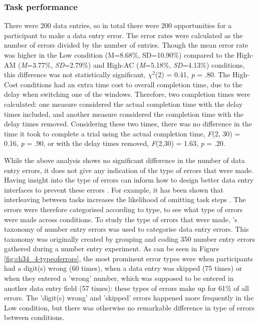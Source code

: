 \subsubsection{Task performance}
There were 200 data entries, so in total there were 200 opportunities for a participant to make a data entry error. The error rates were calculated as the number of errors divided by the number of entries. Though the mean error rate was higher in the Low condition (M=8.68\%, SD=10.90\%) compared to the High-AM (\textit{M}=3.77\%, \textit{SD}=2.79\%) and High-AC (\textit{M}=5.18\%, \textit{SD}=4.13\%) conditions, this difference was not statistically significant, $\chi^2$(2) = 0.41, \textit{p} = .80. 
The High-Cost conditions had an extra time cost to overall completion time, due to the delay when switching one of the windows. Therefore, two completion times were calculated: one measure considered the actual completion time with the delay times included, and another measure considered the completion time with the delay times removed. Considering these two times, there was no difference in the time it took to complete a trial using the actual completion time,  \textit{F}(2, 30) = 0.16, \textit{p} = .90, or with the delay times removed, \textit{F}(2,30) = 1.63, \textit{p} = .20.


While the above analysis shows no significant difference in the number of data entry errors, it does not give any indication of the type of errors that were made. Having insight into the type of errors can inform how to design better data entry interfaces to prevent these errors \citep{Wiseman2011}. For example, it has been shown that interleaving between tasks increases the likelihood of omitting task steps \citep{Back2012}. %
The errors were therefore categorised according to type, to see what type of errors were made across conditions. To study the type of errors that were made, \citeauthor{Wiseman2011}'s \citeyearpar{Wiseman2011} taxonomy of number entry errors was used to categorise data entry errors. This taxonomy was originally created by grouping and coding 350 number entry errors gathered during a number entry experiment. As can be seen in Figure \ref{fig:ch34_4-typeoferrors}, the most prominent error types were when participants had a digit(s) wrong (60 times), when a data entry was skipped (75 times) or when they entered a 'wrong' number, which was supposed to be entered in another data entry field (57 times): these types of errors make up for 61\% of all errors. The 'digit(s) wrong' and 'skipped' errors happened more frequently in the Low condition, but there was otherwise no remarkable difference in type of errors between conditions. 

